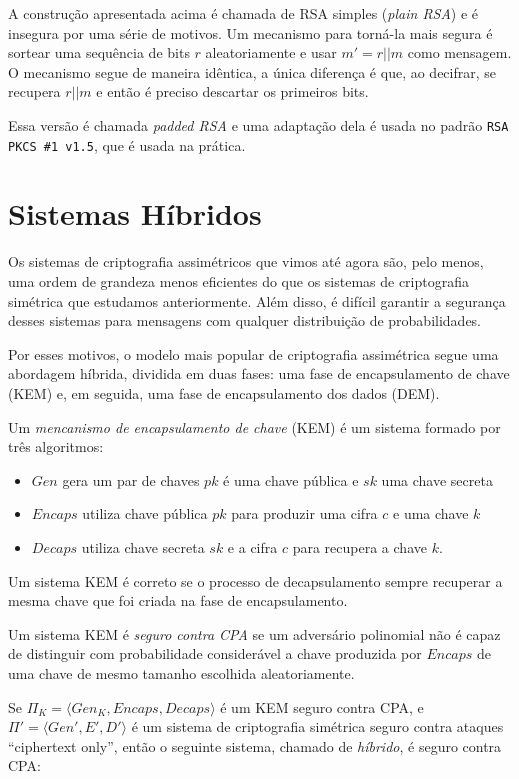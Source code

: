 A construção apresentada acima é chamada de RSA simples ({\em plain RSA}) e é insegura por uma série de motivos.
Um mecanismo para torná-la mais segura é sortear uma sequência de bits $r$ aleatoriamente e usar $m' = r||m$ como mensagem.
O mecanismo segue de maneira idêntica, a única diferença é que, ao decifrar, se recupera $r||m$ e então é preciso descartar os primeiros bits.

Essa versão é chamada {\em padded RSA} e uma adaptação dela é usada no padrão {\tt RSA PKCS \#1 v1.5}, que é usada na prática.


\section{Sistemas Híbridos}
\label{sec:sistemas-hibridos}


Os sistemas de criptografia assimétricos que vimos até agora são, pelo menos, uma ordem de grandeza menos eficientes do que os sistemas de criptografia simétrica que estudamos anteriormente.
Além disso, é difícil garantir a segurança desses sistemas para mensagens com qualquer distribuição de probabilidades.

Por esses motivos, o modelo mais popular de criptografia assimétrica segue uma abordagem híbrida, dividida em duas fases:
uma fase de encapsulamento de chave (KEM) e, em seguida, uma fase de encapsulamento dos dados (DEM).

Um {\em mencanismo de encapsulamento de chave} (KEM) é um sistema formado por três algoritmos:
\begin{itemize}
\item $Gen$ gera um par de chaves $pk$ é uma chave pública e $sk$ uma chave secreta
\item $Encaps$ utiliza chave pública $pk$ para produzir uma cifra $c$ e uma chave $k$
\item $Decaps$ utiliza chave secreta $sk$ e a cifra $c$ para recupera a chave $k$.
\end{itemize}

Um sistema KEM é correto se o processo de decapsulamento sempre recuperar a mesma chave que foi criada na fase de encapsulamento.

Um sistema KEM é {\em seguro contra CPA} se um adversário polinomial não é capaz de distinguir com probabilidade considerável a chave produzida por $Encaps$ de uma chave de mesmo tamanho escolhida aleatoriamente.

Se $\Pi_K = \langle Gen_K, Encaps, Decaps \rangle$ é um KEM seguro contra CPA, e $\Pi' = \langle Gen', E', D' \rangle$ é um sistema de criptografia simétrica seguro contra ataques ``ciphertext only'', então o seguinte sistema, chamado de {\em híbrido}, é seguro contra CPA:

